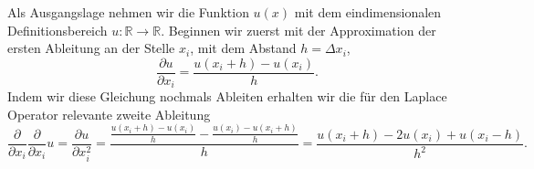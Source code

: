 Als Ausgangslage nehmen wir die Funktion $u(x)$ mit dem eindimensionalen 
Definitionsbereich $u: \mathbb{R} \rightarrow \mathbb{R}$. Beginnen wir zuerst 
mit der Approximation der ersten Ableitung an der Stelle $x_i$, mit dem Abstand 
$h = \Delta x_i$,
\begin{equation*}
\frac{\partial u}{\partial x_i}
= \frac{u(x_i+h)-u(x_i)}{h}.
\end{equation*}
Indem wir diese Gleichung nochmals Ableiten erhalten wir die f\"ur den Laplace 
Operator relevante zweite Ableitung
\begin{equation*}
\frac{\partial}{\partial x_i}\frac{\partial}{\partial x_i}u
= \frac{\partial u}{\partial x_i^2}
= \frac{\frac{u(x_i+h)-u(x_i)}{h}-\frac{u(x_i)-u(x_i+h)}{h}}{h}
= \frac{u(x_i+h)-2u(x_i)+u(x_i-h)}{h^2}.
\end{equation*}

